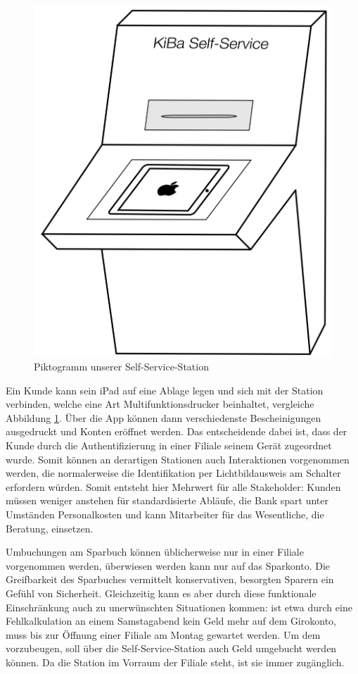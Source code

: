 \begin{figure}
	\centering
	\includegraphics[scale=0.2]{Pictures/SelfService}
	\caption{Piktogramm unserer Self-Service-Station\label{fig:SelfService}}
\end{figure}
	
	Ein Kunde kann sein iPad auf eine Ablage legen und sich mit der Station verbinden, welche eine Art Multifunktionsdrucker beinhaltet, vergleiche Abbildung \ref{fig:SelfService}. Über die App können dann verschiedenste Bescheinigungen ausgedruckt und Konten eröffnet werden. Das entscheidende dabei ist, dass der Kunde durch die Authentifizierung in einer Filiale seinem Gerät zugeordnet wurde. Somit können an derartigen Stationen auch Interaktionen vorgenommen werden, die normalerweise die Identifikation per Lichtbildausweis am Schalter erfordern würden. Somit entsteht hier Mehrwert für alle Stakeholder: Kunden müssen weniger anstehen für standardisierte Abläufe, die Bank spart unter Umständen Personalkosten und kann Mitarbeiter für das Wesentliche, die Beratung, einsetzen.

   Umbuchungen am Sparbuch können üblicherweise nur in einer Filiale vorgenommen werden, überwiesen werden kann nur auf das Sparkonto. Die Greifbarkeit des Sparbuches vermittelt konservativen, besorgten Sparern ein Gefühl von Sicherheit. Gleichzeitig kann es aber durch diese funktionale Einschränkung auch zu unerwünschten Situationen kommen: ist etwa durch eine Fehlkalkulation an einem Samstagabend kein Geld mehr auf dem Girokonto, muss bis zur Öffnung einer Filiale am Montag gewartet werden. Um dem vorzubeugen, soll über die Self-Service-Station auch Geld umgebucht werden können. Da die Station im Vorraum der Filiale steht, ist sie immer zugänglich.   
    

